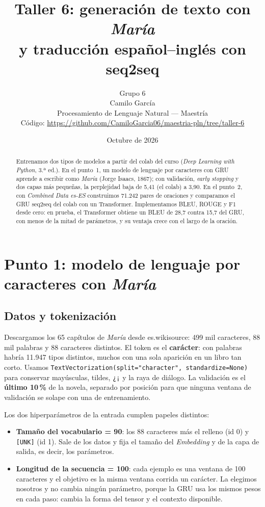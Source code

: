 \documentclass[12pt,a4paper]{article}
\title{\textbf{Taller 6: generación de texto con \emph{María}\\y traducción español--inglés con seq2seq}}
\author{Grupo 6 \\ Camilo García \\[0.3em]
  \small Procesamiento de Lenguaje Natural --- Maestría \\
  \small Código: \url{https://github.com/CamiloGarcia06/maestria-pln/tree/taller-6}}
\date{Octubre de 2026}
\begin{document}
\maketitle

\begin{abstract}
\noindent
Entrenamos dos tipos de modelos a partir del colab del curso (\emph{Deep Learning with Python}, 3.ª ed.).
En el punto~1, un modelo de lenguaje por caracteres con GRU aprende a escribir como \emph{María}
(Jorge Isaacs, 1867); con validación, \emph{early stopping} y dos capas más pequeñas, la perplejidad
baja de 5,41 (el colab) a 3,90. En el punto~2, con \emph{Combined Data es-ES} construimos 71.242
pares de oraciones y comparamos el GRU seq2seq del colab con un Transformer. Implementamos BLEU,
ROUGE y F1 desde cero: en prueba, el Transformer obtiene un BLEU de 28,7 contra 15,7 del GRU, con
menos de la mitad de parámetros, y su ventaja crece con el largo de la oración.
\end{abstract}

\section{Punto 1: modelo de lenguaje por caracteres con \emph{María}}

\subsection{Datos y tokenización}

Descargamos los 65 capítulos de \emph{María} desde es.wikisource: 499 mil caracteres, 88 mil palabras
y 88 caracteres distintos. El token es el \textbf{carácter}: con palabras habría 11.947 tipos
distintos, muchos con una sola aparición en un libro tan corto. Usamos
\texttt{TextVectorization(split="character", standardize=None)} para conservar mayúsculas, tildes,
\texttt{¿¡} y la raya de diálogo. La validación es el \textbf{último 10\,\%} de la novela, separado por
posición para que ninguna ventana de validación se solape con una de entrenamiento.

Los dos hiperparámetros de la entrada cumplen papeles distintos:
\begin{itemize}\setlength{\itemsep}{0pt}
  \item \textbf{Tamaño del vocabulario = 90}: los 88 caracteres más el relleno (id 0) y \texttt{[UNK]} (id 1).
    Sale de los datos y fija el tamaño del \emph{Embedding} y de la capa de salida, es decir, los parámetros.
  \item \textbf{Longitud de la secuencia = 100}: cada ejemplo es una ventana de 100 caracteres y el objetivo
    es la misma ventana corrida un carácter. La elegimos nosotros y no cambia ningún parámetro, porque la
    GRU usa los mismos pesos en cada paso: cambia la forma del tensor y el contexto disponible.
\end{itemize}
\end{document}
